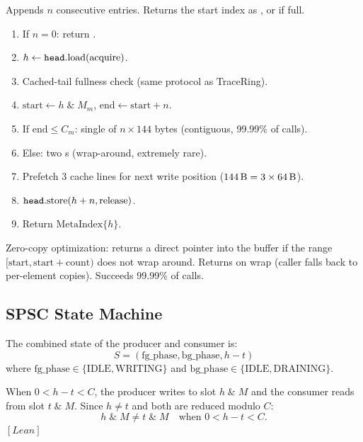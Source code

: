 \begin{algorithm_spec}
\label{alg:meta-append}
Appends $n$ consecutive  entries.
Returns the start index as , or  if full.

\begin{enumerate}
  \item If $n = 0$: return .
  \item $h \leftarrow \texttt{head}.\text{load(acquire)}$.
  \item Cached-tail fullness check (same protocol as TraceRing).
  \item $\text{start} \leftarrow h \;\mathbin{\&}\; M_m$,
        $\text{end} \leftarrow \text{start} + n$.
  \item If $\text{end} \le C_m$: single 
        of $n \times 144$ bytes (contiguous, 99.99\% of calls).
  \item Else: two s (wrap-around, extremely rare).
  \item Prefetch 3 cache lines for next write position
        ($144\,\text{B} = 3 \times 64\,\text{B}$).
  \item $\texttt{head}.\text{store}(h + n, \text{release})$.
  \item Return $\text{MetaIndex}\{h\}$.
\end{enumerate}
\end{algorithm_spec}

\begin{algorithm_spec}
Zero-copy optimization: returns a direct pointer into the buffer
if the range $[\text{start}, \text{start}+\text{count})$ does not
wrap around.  Returns  on wrap (caller falls back to
per-element  copies).  Succeeds 99.99\% of calls.
\end{algorithm_spec}

\subsection{SPSC State Machine}

The combined state of the producer and consumer is:
\[
  S = (\text{fg\_phase}, \text{bg\_phase}, h - t)
\]
where $\text{fg\_phase} \in \{\text{IDLE}, \text{WRITING}\}$ and
$\text{bg\_phase} \in \{\text{IDLE}, \text{DRAINING}\}$.

\begin{invariant}
\label{inv:no-collision}
When $0 < h - t < C$, the producer writes to slot $h \;\mathbin{\&}\; M$
and the consumer reads from slot $t \;\mathbin{\&}\; M$.
Since $h \neq t$ and both are reduced modulo $C$:
\[
  h \;\mathbin{\&}\; M \neq t \;\mathbin{\&}\; M
  \quad \text{when } 0 < h - t < C.
\]
$[\textit{Lean}]$
\end{invariant}

